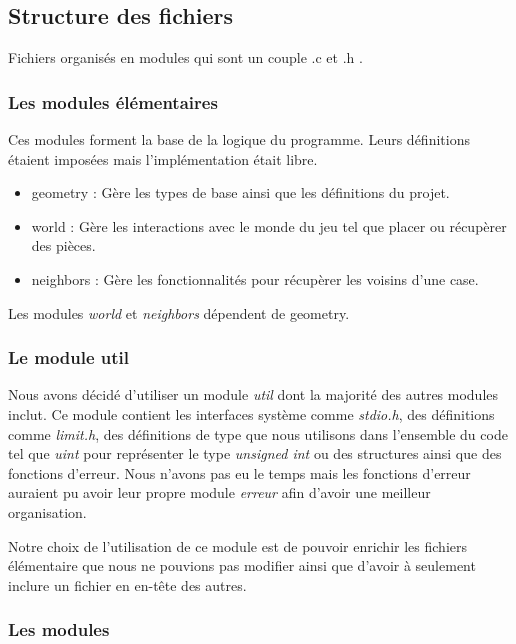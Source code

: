 \subsection{Structure des fichiers}

Fichiers organisés en modules qui sont un couple .c et .h .  

\subsubsection{Les modules élémentaires}

Ces modules forment la base de la logique du programme.
Leurs définitions étaient imposées mais l'implémentation était libre. 

\begin{itemize}
    \item geometry : Gère les types de base ainsi que les définitions du projet.
    \item world : Gère les interactions avec le monde du jeu tel que placer ou récupèrer des pièces.
    \item neighbors : Gère les fonctionnalités pour récupèrer les voisins d'une case.
\end{itemize}

Les modules \emph{world} et \emph{neighbors} dépendent de geometry.


\subsubsection{Le module util}
\label{ssec:module-util}
Nous avons décidé d'utiliser un module \emph{util} dont la majorité des autres modules inclut. 
Ce module contient les interfaces système comme \emph{stdio.h}, des définitions comme \emph{limit.h},
des définitions de type que nous utilisons dans l'ensemble du code tel que \emph{uint} pour représenter
le type \emph{unsigned int} ou des structures ainsi que des fonctions d'erreur. Nous n'avons pas eu le temps
mais les fonctions d'erreur auraient pu avoir leur propre module \emph{erreur} afin d'avoir une meilleur organisation.

Notre choix de l'utilisation de ce module est de pouvoir enrichir les fichiers élémentaire que nous ne pouvions pas 
modifier ainsi que d'avoir à seulement inclure un fichier en en-tête des autres.  


\subsubsection{Les modules}

